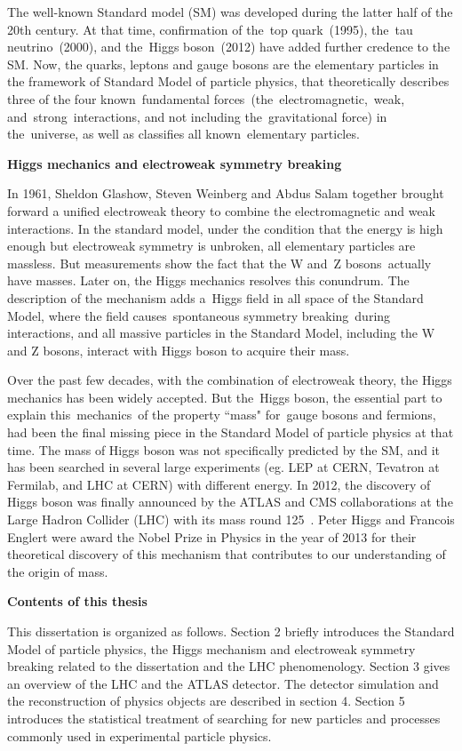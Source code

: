 The well-known Standard model (SM) was developed during the latter half of the 20th century. 
At that time, confirmation of the top quark (1995), the tau neutrino (2000), and the Higgs boson (2012) have added further credence to the SM.
Now, the quarks, leptons and gauge bosons are the elementary particles in the framework of Standard Model of particle physics, 
that theoretically describes three of the four known fundamental forces (the electromagnetic, weak, and strong interactions, and not including the gravitational force) in the universe, 
as well as classifies all known elementary particles.

\textbf{Higgs mechanics and electroweak symmetry breaking}

In 1961, Sheldon Glashow, Steven Weinberg and Abdus Salam together brought forward a unified electroweak theory to combine the electromagnetic and weak interactions. 
In the standard model, under the condition that the energy is high enough but electroweak symmetry is unbroken, all elementary particles are massless. 
But measurements show the fact that the W and Z bosons actually have masses. 
Later on, the Higgs mechanics resolves this conundrum. 
The description of the mechanism adds a Higgs field in all space of the Standard Model, 
where the field causes spontaneous symmetry breaking during interactions,
and all massive particles in the Standard Model, including the W and Z bosons, interact with Higgs boson to acquire their mass.

Over the past few decades, with the combination of electroweak theory, the Higgs mechanics has been widely accepted. 
But the Higgs boson, the essential part to explain this mechanics of the property ``mass" for gauge bosons and fermions, had been the final missing piece in the Standard Model of particle physics at that time. 
The mass of Higgs boson was not specifically predicted by the SM, and it has been searched in several large experiments (eg. LEP at CERN, Tevatron at Fermilab, and LHC at CERN) with different energy. 
In 2012, the discovery of Higgs boson was finally announced by the ATLAS and CMS collaborations at the Large Hadron Collider (LHC) with its mass round 125~\gev. 
Peter Higgs and Francois Englert were award the Nobel Prize in Physics in the year of 2013 for their theoretical discovery of 
this mechanism that contributes to our understanding of the origin of mass.

\textbf{Contents of this thesis}

This dissertation is organized as follows. 
Section 2 briefly introduces the Standard Model of particle physics, the Higgs mechanism and electroweak symmetry breaking related to the dissertation and the LHC phenomenology. 
Section 3 gives an overview of the LHC and the ATLAS detector. 
The detector simulation and the reconstruction of physics objects are described in section 4. 
Section 5 introduces the statistical treatment of searching for new particles and processes commonly used in experimental particle physics.

